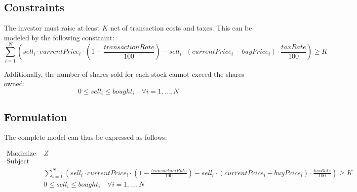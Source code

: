 \documentclass{article}
\begin{document}
\subsection*{Constraints}
The investor must raise at least \( K \) net of transaction costs and taxes. This can be modeled by the following constraint:
\[
\sum_{i=1}^{N} \left( sell_i \cdot currentPrice_i \cdot (1 - \frac{transactionRate}{100}) - sell_i \cdot (currentPrice_i - buyPrice_i) \cdot \frac{taxRate}{100} \right) \geq K
\]

Additionally, the number of shares sold for each stock cannot exceed the shares owned:
\[
0 \leq sell_i \leq bought_i \quad \forall i = 1, \ldots, N
\]

\subsection*{Formulation}
The complete model can thus be expressed as follows:

\[
\begin{align*}
\text{Maximize } & Z \\
\text{Subject to:} \\
& \sum_{i=1}^{N} \left( sell_i \cdot currentPrice_i \cdot (1 - \frac{transactionRate}{100}) - sell_i \cdot (currentPrice_i - buyPrice_i) \cdot \frac{taxRate}{100} \right) \geq K \\
& 0 \leq sell_i \leq bought_i \quad \forall i = 1, \ldots, N \\
\end{align*}
\]
\end{document}
